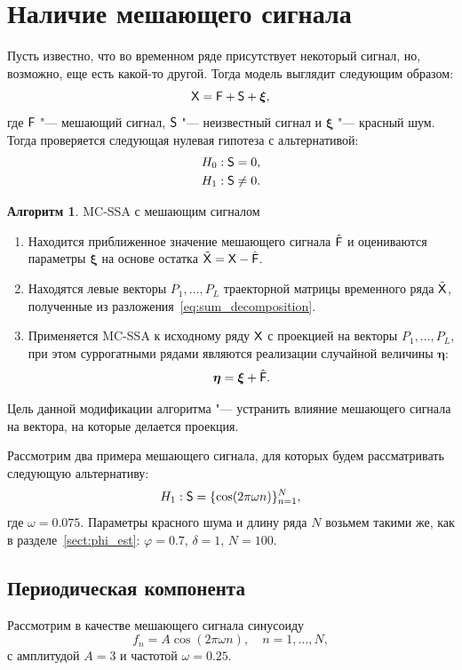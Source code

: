 \documentclass[specialist,
substylefile = spbu_report.rtx,
subf,href,colorlinks=true, 12pt]{disser}
\theoremstyle{definition}
\newtheorem{algorithm}{Алгоритм}
\newcommand{\bfxi}{\boldsymbol{\xi}}
\begin{document}
\section{Наличие мешающего сигнала}\label{sect:nuisance}
Пусть известно, что во временном ряде присутствует некоторый сигнал, но, возможно, еще есть какой-то другой. Тогда модель выглядит следующим образом:
\[
\tX=\tF + \tS + \bfxi,
\]
где $\mathsf{F}$ "--- мешающий сигнал, $\mathsf{S}$ "--- неизвестный сигнал и $\bfxi$ "--- красный шум.
Тогда проверяется следующая нулевая гипотеза с альтернативой:
\begin{align*}
&H_0: \mathsf{S}=0,\\
&H_1: \mathsf{S} \ne 0.
\end{align*}
\begin{algorithm}{MC-SSA с мешающим сигналом}\label{mc-ssa_nuisance}
\begin{enumerate}
	\item Находится приближенное значение мешающего сигнала $\hat{\mathsf{F}}$ и оцениваются параметры $\bfxi$ на основе остатка $\tilde{\mathsf{X}}=\mathsf{X}-\hat{\mathsf{F}}$.
	\item Находятся левые векторы $P_1,\ldots,P_L$ траекторной матрицы временного ряда $\tilde{\mathsf{X}}$, полученные из разложения~\eqref{eq:sum_decomposition}. 
	\item Применяется MC-SSA к исходному ряду $\mathsf{X}$ с проекцией на векторы $P_1,\ldots,P_L$, при этом суррогатными рядами являются реализации случайной величины $\boldsymbol{\eta}$:
	\[
	\boldsymbol{\eta} = \bfxi + \hat\tF.
	\]
\end{enumerate}
\end{algorithm}
Цель данной модификации алгоритма "--- устранить влияние мешающего сигнала на вектора, на которые делается проекция.

Рассмотрим два примера мешающего сигнала, для которых будем рассматривать следующую альтернативу:
\[
	H_1: \mathsf{S} = \{\cos(2\pi\omega n)\}_{n=1}^N,
\]
где $\omega=0.075$. Параметры красного шума и длину ряда $N$ возьмем такими же, как в разделе~\ref{sect:phi_est}: $\varphi=0.7$, $\delta=1$, $N=100$. 
\subsection{Периодическая компонента}\label{sect:periodic_case}
Рассмотрим в качестве мешающего сигнала синусоиду
\[
f_n=A\cos(2\pi\omega n),\quad n=1,\ldots,N,
\]
с амплитудой $A=3$ и частотой $\omega=0.25$.
\end{document}
